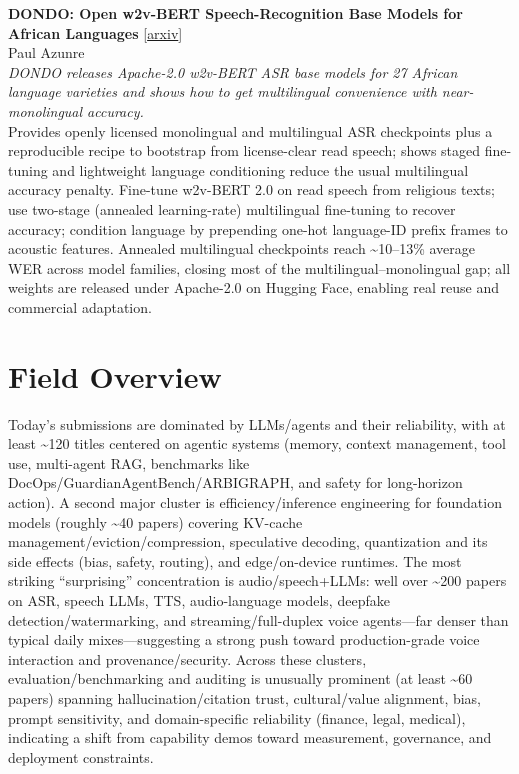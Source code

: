 \documentclass[12pt,letterpaper]{article}
\begin{document}
\medskip

{\small\textbf{DONDO: Open w2v-BERT Speech-Recognition Base Models for African Languages}} {\scriptsize[\href{https://arxiv.org/abs/2607.21540}{arxiv}]}\\
{\scriptsize Paul Azunre}\\

{\small\textit{DONDO releases Apache-2.0 w2v-BERT ASR base models for 27 African language varieties and shows how to get multilingual convenience with near-monolingual accuracy.}}\\[1pt]
{\footnotesize Provides openly licensed monolingual and multilingual ASR checkpoints plus a reproducible recipe to bootstrap from license-clear read speech; shows staged fine-tuning and lightweight language conditioning reduce the usual multilingual accuracy penalty. Fine-tune w2v-BERT 2.0 on read speech from religious texts; use two-stage (annealed learning-rate) multilingual fine-tuning to recover accuracy; condition language by prepending one-hot language-ID prefix frames to acoustic features. Annealed multilingual checkpoints reach \textasciitilde{}10--13\% average WER across model families, closing most of the multilingual--monolingual gap; all weights are released under Apache-2.0 on Hugging Face, enabling real reuse and commercial adaptation.}

\medskip



\section*{Field Overview}
{\footnotesize Today's submissions are dominated by LLMs/agents and their reliability, with at least \textasciitilde{}120 titles centered on agentic systems (memory, context management, tool use, multi-agent RAG, benchmarks like DocOps/GuardianAgentBench/ARBIGRAPH, and safety for long-horizon action). A second major cluster is efficiency/inference engineering for foundation models (roughly \textasciitilde{}40 papers) covering KV-cache management/eviction/compression, speculative decoding, quantization and its side effects (bias, safety, routing), and edge/on-device runtimes. The most striking ``surprising'' concentration is audio/speech+LLMs: well over \textasciitilde{}200 papers on ASR, speech LLMs, TTS, audio-language models, deepfake detection/watermarking, and streaming/full-duplex voice agents---far denser than typical daily mixes---suggesting a strong push toward production-grade voice interaction and provenance/security. Across these clusters, evaluation/benchmarking and auditing is unusually prominent (at least \textasciitilde{}60 papers) spanning hallucination/citation trust, cultural/value alignment, bias, prompt sensitivity, and domain-specific reliability (finance, legal, medical), indicating a shift from capability demos toward measurement, governance, and deployment constraints.}
\end{document}
